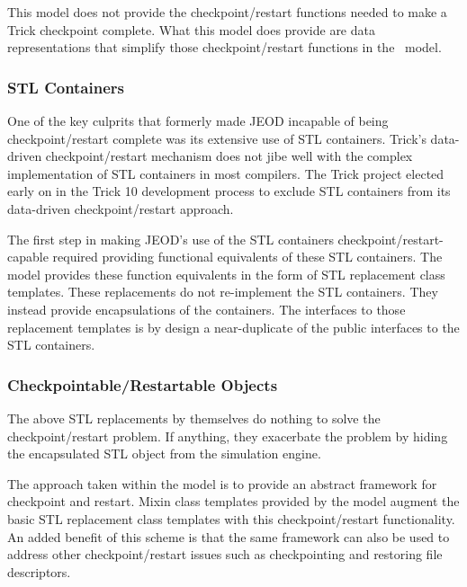 This model does not provide the checkpoint/restart functions needed to make
a Trick checkpoint complete. What this model does provide are data
representations that simplify those checkpoint/restart functions in
the \SIMINTERFACE\ model.

\subsubsection{STL Containers}\label{sec:key_STL}
One of the key culprits that formerly made JEOD incapable of being
checkpoint/restart complete was its extensive use of STL containers.
Trick's data-driven checkpoint/restart mechanism does not jibe well
with the complex implementation of STL containers in most compilers.
The Trick project elected early on in the Trick 10 development process
to exclude STL containers from its data-driven checkpoint/restart approach.

The first step in making JEOD's use of the STL containers
checkpoint/restart-capable required providing functional equivalents of these
STL containers.
The model provides these function equivalents in the form of STL replacement
class templates. These replacements do not re-implement the STL containers.
They instead provide encapsulations of the containers. The interfaces to
those replacement templates is by design a near-duplicate of the public interfaces to the STL containers.

\subsubsection{Checkpointable/Restartable Objects}\label{sec:key_checkpointable}
The above STL replacements by themselves do nothing to solve the
checkpoint/restart problem. If anything, they exacerbate the problem by hiding
the encapsulated STL object from the simulation engine.

The approach taken within the model is to provide an abstract framework
for checkpoint and restart. Mixin class templates provided by the model
augment the basic STL replacement class templates with this checkpoint/restart
functionality. An added benefit of this scheme is that the same framework
can also be used to address other checkpoint/restart issues such as
checkpointing and restoring file descriptors.


